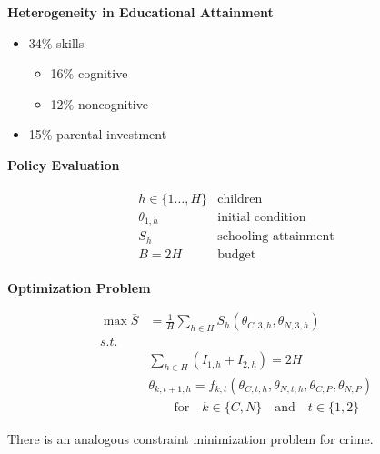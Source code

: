 \begin{frame}\textbf{Heterogeneity in Educational Attainment}\vspace{0.3cm}
\begin{itemize}\setlength\itemsep{1em}
\item 34\% skills\medskip
\begin{itemize}\setlength\itemsep{1em}
\item 16\% cognitive
\item 12\% noncognitive
\end{itemize}
\item 15\% parental investment
\end{itemize}
\end{frame}
\begin{frame}\textbf{Policy Evaluation}

\begin{align*}\begin{array}{ll}
h\in\{1\hdots, H\} & \text{children} \\
\theta_{1,h}   & \text{initial condition}  \\
S_h            & \text{schooling attainment} \\
B = 2H          & \text{budget}
\end{array}\end{align*}

\end{frame}
\begin{frame}\textbf{Optimization Problem}

\begin{align*}
\max \bar{S} & = \frac{1}{H}\sum_{h\in H} S_h(\theta_{C,3,h}, \theta_{N,3,h}) \\
s.t. & \\
     &  \sum_{h\in H} (I_{1, h} + I_{2,h}) = 2H \\
     & \theta_{k, t + 1, h} = f_{k, t}(\theta_{C,t,h}, \theta_{N,t,h}, \theta_{C, P}, \theta_{N, P})\\
     & \qquad \text{for}\quad k \in\{C, N\}\quad\text{and}\quad t\in\{1, 2\}
\end{align*}

There is an analogous constraint minimization problem for crime.

\end{frame}
